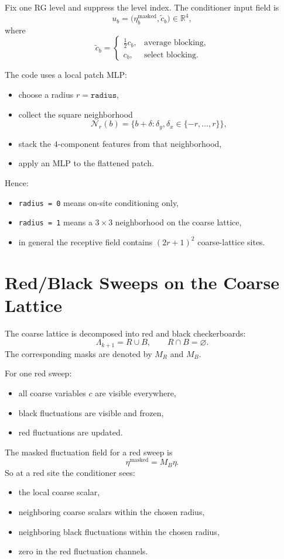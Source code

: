 \documentclass[11pt]{article}
\begin{document}
Fix one RG level and suppress the level index. The conditioner input field is
\[
u_b = \bigl(\eta_b^{\mathrm{masked}}, \tilde c_b\bigr)\in\mathbb{R}^4,
\]
where
\[
\tilde c_b =
\begin{cases}
\tfrac12 c_b,& \text{average blocking,}\\
c_b,& \text{select blocking.}
\end{cases}
\]

The code uses a local patch MLP:
\begin{itemize}
\item choose a radius $r=\texttt{radius}$,
\item collect the square neighborhood
\[
\mathcal N_r(b)=\{b+\delta:\delta_y,\delta_x\in\{-r,\dots,r\}\},
\]
\item stack the $4$-component features from that neighborhood,
\item apply an MLP to the flattened patch.
\end{itemize}

Hence:
\begin{itemize}
\item \texttt{radius = 0} means on-site conditioning only,
\item \texttt{radius = 1} means a $3\times 3$ neighborhood on the coarse
lattice,
\item in general the receptive field contains $(2r+1)^2$ coarse-lattice sites.
\end{itemize}

\section{Red/Black Sweeps on the Coarse Lattice}

The coarse lattice is decomposed into red and black checkerboards:
\[
\Lambda_{k+1} = R \cup B,\qquad R\cap B = \varnothing.
\]
The corresponding masks are denoted by $M_R$ and $M_B$.

For one red sweep:
\begin{itemize}
\item all coarse variables $c$ are visible everywhere,
\item black fluctuations are visible and frozen,
\item red fluctuations are updated.
\end{itemize}

The masked fluctuation field for a red sweep is
\[
\eta^{\mathrm{masked}} = M_B \eta.
\]
So at a red site the conditioner sees:
\begin{itemize}
\item the local coarse scalar,
\item neighboring coarse scalars within the chosen radius,
\item neighboring black fluctuations within the chosen radius,
\item zero in the red fluctuation channels.
\end{itemize}
\end{document}
